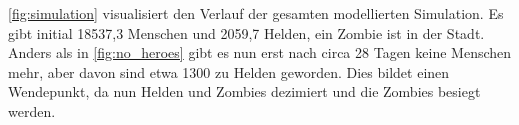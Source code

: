     \autoref{fig:simulation} visualisiert den Verlauf der gesamten modellierten Simulation. Es gibt initial 18537,3 Menschen und 2059,7 Helden, ein Zombie ist in der Stadt. Anders als in \autoref{fig:no_heroes} gibt es nun erst nach circa 28 Tagen keine Menschen mehr, aber davon sind etwa 1300 zu Helden geworden. Dies bildet einen Wendepunkt, da nun Helden und Zombies dezimiert und die Zombies besiegt werden.
